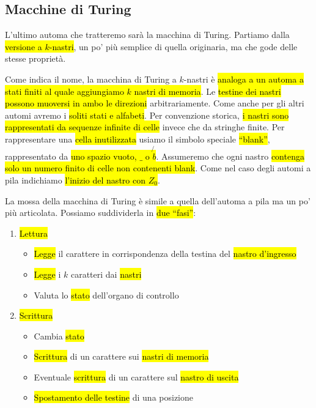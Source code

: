 \documentclass[a4paper,11pt,oneside]{article}
\theoremstyle{plain}
\theoremstyle{definition}
\theoremstyle{remark}
\begin{document}
\subsection{Macchine di Turing}\label{sec:macchine-turing}

L'ultimo automa che tratteremo sarà la macchina di Turing. Partiamo dalla
\hl{versione a $k$-nastri}, un po' più semplice di quella originaria, ma che
gode delle stesse proprietà.

Come indica il nome, la macchina di Turing a $k$-nastri è \hl{analoga a un
automa a stati finiti al quale aggiungiamo $k$ nastri di memoria}. Le
\hl{testine dei nastri possono muoversi in ambo le direzioni} arbitrariamente.
Come anche per gli altri automi avremo i \hl{soliti stati e alfabeti}. Per
convenzione storica, \hl{i nastri sono rappresentati da sequenze infinite di
celle} invece che da stringhe finite. Per rappresentare una \hl{cella
inutilizzata} usiamo il simbolo speciale \hl{``blank''}, rappresentato da
\hl{uno spazio vuoto, $\_$ o $\not{b}$}. Assumeremo che ogni nastro \hl{contenga
solo un numero finito di celle non contenenti blank}. Come nel caso degli automi
a pila indichiamo \hl{l'inizio del nastro con $Z_0$}.

La mossa della macchina di Turing è simile a quella dell'automa a pila ma un po'
più articolata. Possiamo suddividerla in \hl{due ``fasi''}:

\begin{enumerate}
  \item \hl{Lettura}
    \begin{itemize}
      \item \hl{Legge} il carattere in corrispondenza della testina del
        \hl{nastro d'ingresso}
      \item \hl{Legge} i $k$ caratteri dai \hl{nastri}
      \item Valuta lo \hl{stato} dell'organo di controllo
    \end{itemize}
  \item \hl{Scrittura}
    \begin{itemize}
      \item Cambia \hl{stato}
      \item \hl{Scrittura} di un carattere sui \hl{nastri di memoria}
      \item Eventuale \hl{scrittura} di un carattere sul \hl{nastro di uscita}
      \item \hl{Spostamento delle testine} di una posizione
    \end{itemize}
\end{enumerate}
\end{document}
